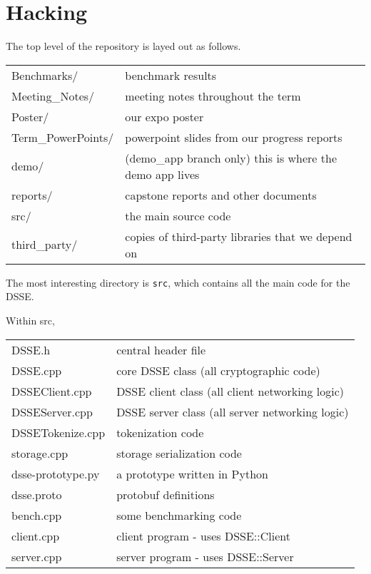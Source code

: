 \section{Hacking}

The top level of the repository is layed out as follows.

\begin{tabular}{ll}
    Benchmarks/         & benchmark results \\
    Meeting\_Notes/      & meeting notes throughout the term \\
    Poster/             & our expo poster \\
    Term\_PowerPoints/   & powerpoint slides from our progress reports \\
    demo/               & (demo\_app branch only) this is where the demo app lives \\
    reports/            & capstone reports and other documents \\
    src/                & the main source code \\
    third\_party/        & copies of third-party libraries that we depend on \\
\end{tabular}

The most interesting directory is \texttt{src}, which contains all the main code for the DSSE.


Within src,

\begin{tabular}{ll}
    DSSE.h                      & central header file \\
    DSSE.cpp                    & core DSSE class (all cryptographic code) \\
    DSSEClient.cpp              & DSSE client class  (all client networking logic) \\
    DSSEServer.cpp              & DSSE server class  (all server networking logic) \\
    DSSETokenize.cpp            & tokenization code \\
    storage.cpp                 & storage serialization code \\
    \hline
    dsse-prototype.py           & a prototype written in Python \\
    dsse.proto                  & protobuf definitions \\
    \hline
    bench.cpp                   & some benchmarking code \\
    client.cpp                  & client program - uses DSSE::Client \\
    server.cpp                  & server program - uses DSSE::Server \\
\end{tabular}


